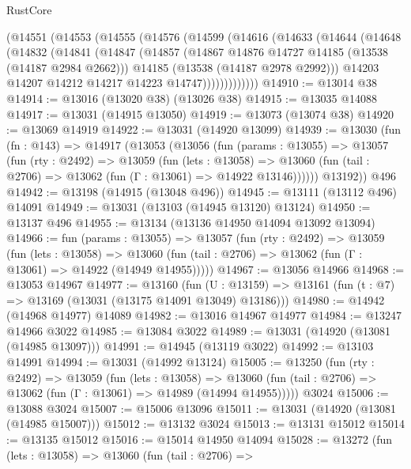\begin{lexlean}{RustCore}
\begin{coremodule}
      (@14551
        (@14553
          (@14555
            (@14576
              (@14599
                (@14616
                  (@14633
                    (@14644
                      (@14648
                        (@14832
                          (@14841
                            (@14847
                              (@14857
                                (@14867 @14876 @14727 @14185 (@13538 (@14187 @2984 @2662)))
                                @14185
                                (@13538 (@14187 @2978 @2992)))
                              @14203
                              @14207
                              @14212
                              @14217
                              @14223
                              @14747)))))))))))))
@14910 := @13014 @38
@14914 := @13016 (@13020 @38) (@13026 @38)
@14915 := @13035 @14088
@14917 := @13031 (@14915 @13050)
@14919 := @13073 (@13074 @38)
@14920 := @13069 @14919
@14922 := @13031 (@14920 @13099)
@14939 := @13030
    (fun (fn : @143) =>
    @14917
      (@13053
        (@13056
          (fun (params : @13055) =>
          @13057
            (fun (rty : @2492) =>
            @13059
              (fun (lets : @13058) =>
              @13060 (fun (tail : @2706) => @13062 (fun (Γ : @13061) => @14922 @13146))))))
        @13192))
    @496
@14942 := @13198 (@14915 (@13048 @496))
@14945 := @13111 (@13112 @496) @14091
@14949 := @13031 (@13103 (@14945 @13120) @13124)
@14950 := @13137 @496
@14955 := @13134 (@13136 @14950 @14094 @13092 @13094)
@14966 := fun (params : @13055) =>
  @13057
    (fun (rty : @2492) =>
    @13059
      (fun (lets : @13058) =>
      @13060 (fun (tail : @2706) => @13062 (fun (Γ : @13061) => @14922 (@14949 @14955)))))
@14967 := @13056 @14966
@14968 := @13053 @14967
@14977 := @13160
    (fun (U : @13159) => @13161 (fun (t : @7) => @13169 (@13031 (@13175 @14091 @13049) @13186)))
@14980 := @14942 (@14968 @14977) @14089
@14982 := @13016 @14967 @14977
@14984 := @13247 @14966 @3022
@14985 := @13084 @3022
@14989 := @13031 (@14920 (@13081 (@14985 @13097)))
@14991 := @14945 (@13119 @3022)
@14992 := @13103 @14991
@14994 := @13031 (@14992 @13124)
@15005 := @13250
    (fun (rty : @2492) =>
    @13059
      (fun (lets : @13058) =>
      @13060 (fun (tail : @2706) => @13062 (fun (Γ : @13061) => @14989 (@14994 @14955)))))
    @3024
@15006 := @13088 @3024
@15007 := @15006 @13096
@15011 := @13031 (@14920 (@13081 (@14985 @15007)))
@15012 := @13132 @3024
@15013 := @13131 @15012
@15014 := @13135 @15012
@15016 := @15014 @14950 @14094
@15028 := @13272
    (fun (lets : @13058) =>
    @13060
      (fun (tail : @2706) =>

\end{coremodule}
\end{lexlean}
